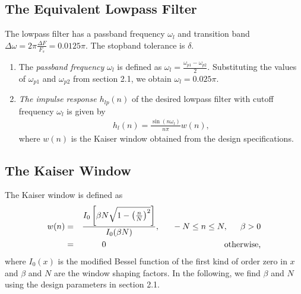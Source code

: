 \documentclass[journal,12pt,twocolumn]{IEEEtran}
\theoremstyle{remark}
\begin{document}
\subsection{\textbf{The Equivalent Lowpass Filter}}
The lowpass filter has a passband frequency $\omega_l$ and transition band $\Delta \omega = 2\pi \frac{\Delta F}{F_s} = 0.0125\pi$.
The stopband tolerance is $\delta$.
\begin{enumerate}
\item  The {\em passband frequency $\omega_l$}  is defined as $\omega_l = \frac{\omega_{p1} - \omega_{p2}}{2}$.  Substituting the values of $\omega_{p1}$ and $\omega_{p2}$ from section 2.1, we obtain $\omega_l = 0.025\pi$.

\item {\em The impulse response $h_{lp}(n)$} of the desired lowpass filter with cutoff frequency $\omega_l$
is given by
\begin{eqnarray}
\label{firlpdef}
h_l(n) = \frac{\sin(n\omega_l)}{n\pi}w(n),
\end{eqnarray}
where $w(n)$ is the Kaiser window obtained from the design specifications.
\end{enumerate}
\subsection{\textbf{The Kaiser Window}}
The Kaiser window is defined as
\begin{eqnarray}
\label{kaiser}
w(n) &=& \frac{I_0\left[ \beta N \sqrt{1 - \left(\frac{n}{N}\right)^2} \right]}{I_0(\beta N)},
\indent -N \leq n \leq N, \indent \beta > 0 \nonumber \\
&=& 0 \hspace{5cm} \mbox{otherwise,}
\end{eqnarray}
where $I_0(x)$ is the modified Bessel function of the first kind of order zero in $x$ and $\beta$
and $N$ are the window shaping factors.  In the following,
we find $\beta$ and $N$ using the design parameters in section 2.1.
\end{document}
